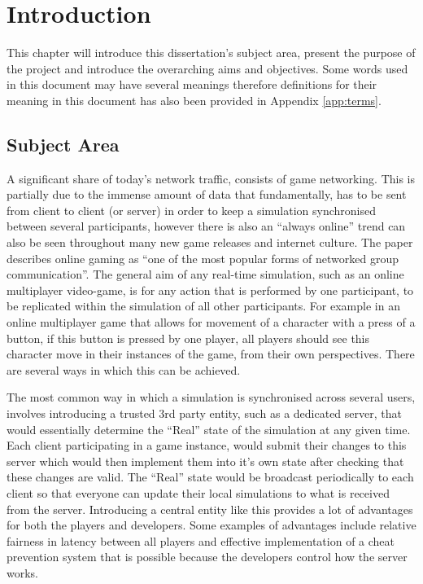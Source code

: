 \chapter{Introduction}
This chapter will introduce this dissertation's subject area, present the purpose of the project and introduce the overarching aims and objectives. Some words used in this document may have several meanings therefore definitions for their meaning in this document has also been provided in Appendix \ref{app:terms}.


\section{Subject Area}
A significant share of today's network traffic, consists of game networking. This is partially due to the immense amount of data that fundamentally, has to be sent from client to client (or server) in order to keep a simulation synchronised between several participants, however there is also an ``always online'' trend can also be seen throughout many new game releases and internet culture. The paper  describes online gaming as ``one of the most popular forms of networked group communication''. The general aim of any real-time simulation, such as an online multiplayer video-game, is for any action that is performed by one participant, to be replicated within the simulation of all other participants. For example in an online multiplayer game that allows for movement of a character with a press of a button, if this button is pressed by one player, all players should see this character move in their instances of the game, from their own perspectives. There are several ways in which this can be achieved.

The most common way in which a simulation is synchronised across several users, involves introducing a trusted 3rd party entity, such as a dedicated server, that would essentially determine the ``Real'' state of the simulation at any given time. Each client participating in a game instance, would submit their changes to this server which would then implement them into it's own state after checking that these changes are valid. The ``Real'' state would be broadcast periodically to each client so that everyone can update their local simulations to what is received from the server. Introducing a central entity like this provides a lot of advantages for both the players and developers. Some examples of advantages include relative fairness in latency between all players and effective implementation of a cheat prevention system that is possible because the developers control how the server works.

